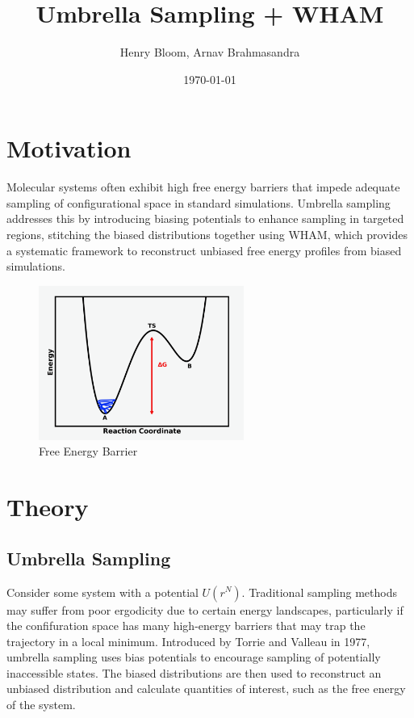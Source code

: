\documentclass{article}
\title{Umbrella Sampling + WHAM}
\author{Henry Bloom, Arnav Brahmasandra}
\date{\today}
\begin{document}
\maketitle

\section{Motivation}
Molecular systems often exhibit high free energy barriers that impede adequate sampling of configurational space in standard simulations. 
Umbrella sampling addresses this by introducing biasing potentials to enhance sampling in targeted regions, stitching the biased distributions together using WHAM, which provides a systematic framework to reconstruct unbiased free energy profiles from biased simulations. 

\begin{figure}[h]%
    \centering
    \includegraphics[width=0.6\textwidth]{images/motivation_img.png}
    \caption{Free Energy Barrier \cite{compchem}}%
    \label{fig:free_energy_barrier}%
\end{figure}

\section{Theory}

\subsection{Umbrella Sampling}
Consider some system with a potential $U(r^N)$. 
Traditional sampling methods may suffer from poor ergodicity due to certain energy landscapes, particularly if the confifuration space has many high-energy barriers that may trap the trajectory in a local minimum.
Introduced by Torrie and Valleau in 1977, umbrella sampling uses bias potentials to encourage sampling of potentially inaccessible states.
The biased distributions are then used to reconstruct an unbiased distribution and calculate quantities of interest, such as the free energy of the system.
\end{document}
